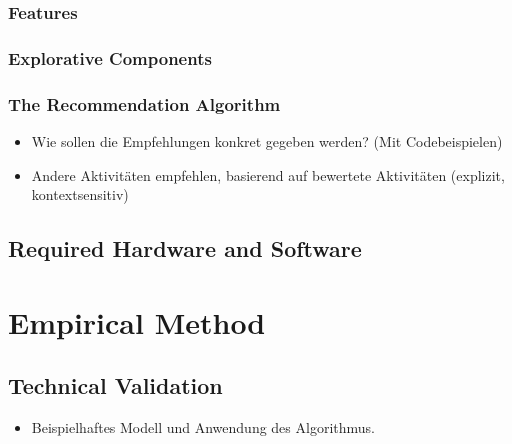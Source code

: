\documentclass[12pt,numbers=noenddot,parskip,bibliography=totocnumbered,listof=totocnumbered]{scrreprt}
\begin{document}

\subsection{Features}

\subsection{Explorative Components}

\subsection{The Recommendation Algorithm}
\begin{itemize} 
	\item Wie sollen die Empfehlungen konkret gegeben werden? (Mit Codebeispielen)
	\item Andere Aktivitäten empfehlen, basierend auf bewertete Aktivitäten (explizit, kontextsensitiv)
\end{itemize} 
	
\section{Required Hardware and Software}

\chapter{Empirical Method}

\section{Technical Validation}
\begin{itemize} 
	\item Beispielhaftes Modell und Anwendung des Algorithmus.
\end{itemize} 
\end{document}
